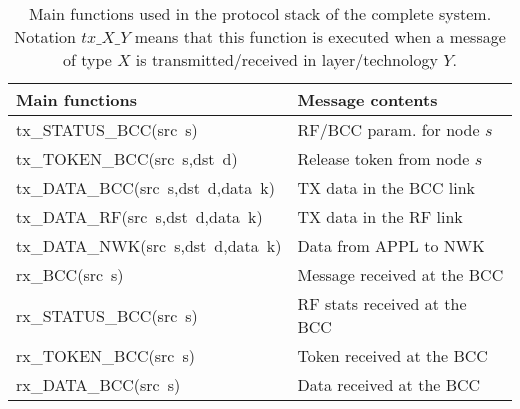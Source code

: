 \documentclass[10pt]{IEEEtran}
\begin{document}
\begin{table}[!t]
\caption{Main functions used in the protocol stack of the complete system. Notation $tx\_X\_Y$ means that this function is executed when a message of type $X$ is transmitted/received in layer/technology $Y$. }
\label{tab1}
\begin{tabular}{|l|l|}
\hline
Main functions & Message contents\\
\hline
tx\_STATUS\_BCC(src~s) & RF/BCC param. for node $s$\\
tx\_TOKEN\_BCC(src~s,dst~d) &  Release token from node $s$\\
tx\_DATA\_BCC(src~s,dst~d,data~k) & TX data in the BCC link \\
tx\_DATA\_RF(src~s,dst~d,data~k) & TX data in the RF link \\
tx\_DATA\_NWK(src~s,dst~d,data~k) & Data from APPL to NWK \\
rx\_BCC(src~s) & Message received at the BCC\\
rx\_STATUS\_BCC(src~s) & RF stats received at the BCC\\
rx\_TOKEN\_BCC(src~s) & Token received at the BCC\\
rx\_DATA\_BCC(src~s) & Data received at the BCC\\
\hline
\end{tabular}
\end{table}
\end{document}
